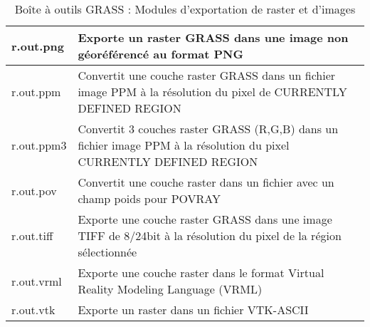 \begin{table}[H]
\begin{tabular}{|p{2.5cm}|p{11.5cm}|}
  \hline r.out.png & Exporte un raster GRASS dans une image non géoréférencé au format PNG \\
  \hline r.out.ppm & Convertit une couche raster GRASS dans un fichier image PPM à la résolution du pixel de CURRENTLY DEFINED REGION \\
  \hline r.out.ppm3 & Convertit 3 couches raster GRASS (R,G,B) dans un fichier image PPM à la résolution du pixel CURRENTLY DEFINED REGION \\
  \hline r.out.pov & Convertit une couche raster dans un fichier avec un champ poids pour POVRAY\\
  \hline r.out.tiff & Exporte une couche raster GRASS dans une image TIFF de 8/24bit à la résolution du pixel de la région sélectionnée\\
  \hline r.out.vrml & Exporte une couche raster dans le format Virtual Reality Modeling Language (VRML)\\
  \hline r.out.vtk & Exporte un raster dans un fichier VTK-ASCII \\
\hline
\end{tabular}
\caption{Boîte à outils GRASS : Modules d'exportation de raster et d'images}
\end{table}

